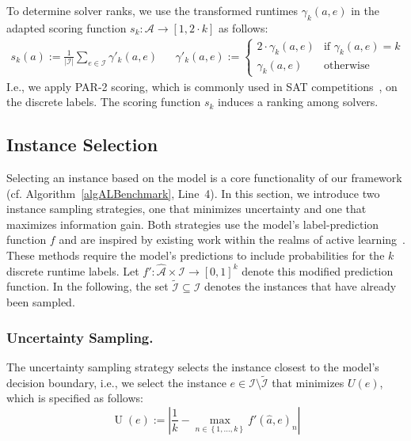 \documentclass[runningheads]{llncs}
\begin{document}
To determine solver ranks, we use the transformed runtimes $\gamma_k(a, e)$ in the adapted scoring function $s_k : \mathcal{A} \rightarrow [1, 2 \cdot k]$ as follows:
%
\begin{align}
  s_k(a) := \frac{1}{|\mathcal{I}|} \sum_{e \in \mathcal{I}} \gamma'_k(a, e)
  &&
  \gamma'_k(a, e) := \begin{cases}
    2 \cdot \gamma_k(a, e)   & \text{if } \gamma_k(a, e) = k\\
  \gamma_k(a, e)  & \text{otherwise}
  \end{cases}
  \label{eq:rankingeq}
\end{align}
%
I.e., we apply PAR-2 scoring, which is commonly used in SAT competitions~\cite{FroleyksHIJS21}, on the discrete labels.
The scoring function $s_k$ induces a ranking among solvers.


\subsection{Instance Selection}
\label{sec:main:selection}

Selecting an instance based on the model is a core functionality of our framework (cf. Algorithm~\ref{algALBenchmark}, Line~4).
In this section, we introduce two instance sampling strategies, one that minimizes uncertainty and one that maximizes information gain.
Both strategies use the model's label-prediction function $f$ and are inspired by existing work within the realms of active learning~\cite{settles2009active}.
These methods require the model's predictions to include probabilities for the $k$ discrete runtime labels.
Let \mbox{$f' : \mathcal{\hat A} \times \mathcal{I} \rightarrow \left[0, 1\right]^k$} denote this modified prediction function.
In the following, the set $\tilde{\mathcal{I}} \subseteq \mathcal{I}$ denotes the instances that have already been sampled.

\subsubsection{Uncertainty Sampling.}

The uncertainty sampling strategy selects the instance closest to the model's decision boundary, i.e., 
we select the instance $e \in \mathcal{I} \setminus \tilde{\mathcal{I}}$ that minimizes $U(e)$, which is specified as follows:
%
\begin{equation*}
  \operatorname{U}(e) := \left\lvert \frac{1}{k} - \max_{n \in \left\lbrace 1, \dots, k \right\rbrace} f'\!\left(\hat{a}, e\right)_{n} \right\rvert
\end{equation*}
\end{document}
